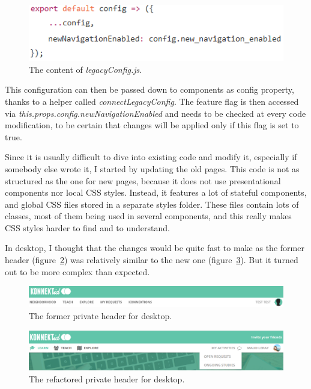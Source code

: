 \begin{figure}[H]
    \centering
    \includegraphics[scale=0.8]{figure/legacyConfig.png}
    \caption{The content of \textit{legacyConfig.js}.}
    \label{fig:legacyConfig}
\end{figure}

This configuration can then be passed down to components as \guillemotleft{} config \guillemotright{} property, thanks to a helper called \textit{connectLegacyConfig}. The feature flag is then accessed via \textit{this.props.config.newNavigationEnabled} and needs to be checked at every code modification, to be certain that changes will be applied only if this flag is set to true.

Since it is usually difficult to dive into existing code and modify it, especially if somebody else wrote it, I started by updating the old pages. This code is not as structured as the one for new pages, because it does not use presentational components nor local CSS styles. Instead, it features a lot of stateful components, and global CSS files stored in a separate \guillemotleft{} styles \guillemotright{} folder. These files contain lots of classes, most of them being used in several components, and this really makes CSS styles harder to find and to understand. 

In desktop, I thought that the changes would be quite fast to make as the former header ({\sc figure}~\ref{fig:oldNavDesktop}) was relatively similar to the new one ({\sc figure}~\ref{fig:newNavDesktop}). But it turned out to be more complex than expected.

\begin{figure}[H]
    \centering
    \includegraphics[scale=0.3]{figure/oldNavDesktop.png}
    \caption{The former private header for desktop.}
    \label{fig:oldNavDesktop}
\end{figure}

\begin{figure}[H]
    \centering
    \includegraphics[scale=0.47]{figure/newNavDesktop.png}
    \caption{The refactored private header for desktop.}
    \label{fig:newNavDesktop}
\end{figure}

